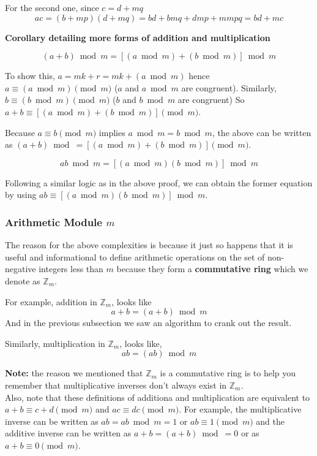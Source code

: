 For the second one, since $c = d + mq$
$$
ac = (b + mp)(d + mq) = bd + bmq + dmp + mmpq = bd + mc
$$

\textbf{Corollary detailing more forms of addition and multiplication}

\begin{equation}
    (a+b) \bmod m = [(a \bmod m) + (b \bmod m)] \bmod m
\end{equation}

To show this,
$a = mk + r = mk + (a \bmod m)$ hence
$a \equiv (a \bmod m) \pmod m$ ($a$ and $a \bmod m$ are congruent).
Similarly, $b \equiv (b \bmod m) \pmod m$ ($b$ and $b \bmod m$ are congruent)
So $a + b \equiv [(a \bmod m) + (b \bmod m)] \pmod m$.

Because $a \equiv b \pmod m$ implies $a \bmod m = b \bmod m$, the above can be written as
$(a+b) \bmod = [(a \bmod m) + (b \bmod m)] \pmod m$.

\begin{equation}
    ab \bmod m = [(a \bmod m)(b \bmod m)] \bmod m
\end{equation}

Following a similar logic as in the above proof, we can obtain the former equation by using $ab \equiv [(a \bmod m)(b \bmod m)] \bmod m$.


\subsubsection{Arithmetic Module $m$}

The reason for the above complexities is because it just so happens that it is useful and informational
to define arithmetic operations on the set of non-negative integers less than $m$ because they form
a \textbf{commutative ring} which we denote as $\mathbb{Z}_m$.

For example, addition in $\mathbb{Z}_m$, looks like
$$
a + b = (a+b) \bmod m
$$
And in the previous subsection we saw an algorithm to crank out the result.

Similarly, multiplication in $\mathbb{Z}_m$, looks like,
$$
ab = (ab) \bmod m
$$

\textbf{Note:} the reason we mentioned that $\mathbb{Z}_m$ is a commutative ring is to help you remember that
multiplicative inverses don't always exist in $\mathbb{Z}_m$.
\\

Also, note that these definitions of additiona and multiplication are equivalent to
$a + b \equiv c+d \pmod m$ and $ac \equiv dc \pmod m$.
For example, the multiplicative inverse can be written as $ab = ab \bmod m = 1$ or $ab \equiv 1 \pmod m$
and the additive inverse can be written as $a+b = (a+b) \bmod = 0$ or as $a+b \equiv 0 \pmod m$.
\\~\\

